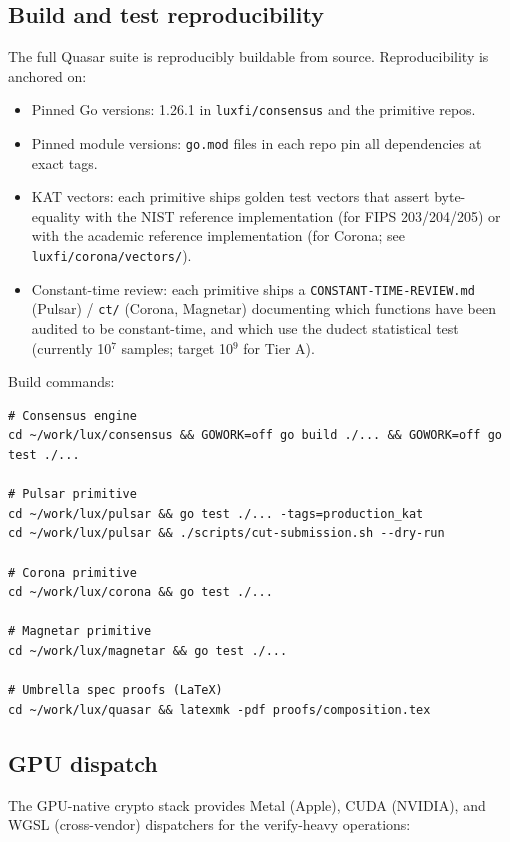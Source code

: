 \subsection{Build and test reproducibility}

The full Quasar suite is reproducibly buildable from source.
Reproducibility is anchored on:

\begin{itemize}[leftmargin=2em,nosep]
\item Pinned Go versions: 1.26.1 in \texttt{luxfi/consensus} and the
      primitive repos.
\item Pinned module versions: \texttt{go.mod} files in each repo
      pin all dependencies at exact tags.
\item KAT vectors: each primitive ships golden test vectors that
      assert byte-equality with the NIST reference implementation
      (for FIPS 203/204/205) or with the academic reference
      implementation (for Corona; see \texttt{luxfi/corona/vectors/}).
\item Constant-time review: each primitive ships a
      \texttt{CONSTANT-TIME-REVIEW.md} (Pulsar) /
      \texttt{ct/} (Corona, Magnetar) documenting which functions
      have been audited to be constant-time, and which use the
      dudect statistical test (currently 10$^7$ samples; target
      10$^9$ for Tier A).
\end{itemize}

Build commands:
\begin{verbatim}
# Consensus engine
cd ~/work/lux/consensus && GOWORK=off go build ./... && GOWORK=off go test ./...

# Pulsar primitive
cd ~/work/lux/pulsar && go test ./... -tags=production_kat
cd ~/work/lux/pulsar && ./scripts/cut-submission.sh --dry-run

# Corona primitive
cd ~/work/lux/corona && go test ./...

# Magnetar primitive
cd ~/work/lux/magnetar && go test ./...

# Umbrella spec proofs (LaTeX)
cd ~/work/lux/quasar && latexmk -pdf proofs/composition.tex
\end{verbatim}

\subsection{GPU dispatch}

The GPU-native crypto stack \cite{lp137} provides Metal (Apple),
CUDA (NVIDIA), and WGSL (cross-vendor) dispatchers for the
verify-heavy operations:

